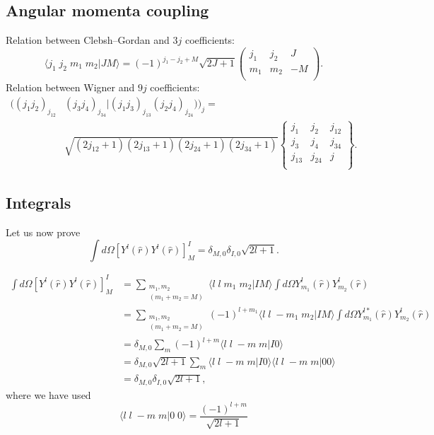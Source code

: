 \begin{subappendices}
\subsection{Angular momenta coupling}
Relation between Clebsh--Gordan and $3j$ coefficients:
\begin{equation}\label{eq204}
\langle j_1\; j_2 \; m_1\;m_2 | J M\rangle=(-1)^{j_1-j_2+M}\sqrt{2J+1}\begin{pmatrix}
  j_1&j_2&J\\
 m_1&m_2&-M\\
\end{pmatrix}.
\end{equation}
Relation between Wigner and $9j$ coefficients:
\begin{equation}\label{eq205}
\begin{split}
\bigl ( (j_1j_2)_{j_{12}}& (j_3j_4)_{j_{34}} |(j_1j_3)_{j_{13}} (j_2j_4)_{j_{24}}) \bigr )_j=\\
&\sqrt{(2j_{12}+1)(2j_{13}+1)(2j_{24}+1)(2j_{34}+1)}\begin{Bmatrix}
  j_1&j_2&j_{12}\\
 j_3&j_4&j_{34}\\
 j_{13}&j_{24}&j\\
\end{Bmatrix}.
\end{split}
\end{equation}
\subsection{Integrals}
Let us now prove
\begin{equation}\label{eq14}
\int d\Omega \left[ Y^{l}(\hat r)Y^{l}(\hat r) \right]^{I}_{M}=\delta_{M,0}\delta_{I,0}\sqrt{2l+1}.
\end{equation}

\begin{equation}\label{eq15}
\begin{split}
\int d\Omega \left[ Y^{l}(\hat r)Y^{l}(\hat r) \right]^{I}_{M}&= \sum_{\substack{m_1,m_2\\(m_1+m_2=M)}}
\langle l\; l \; m_1\;m_2 | I M\rangle \int d\Omega  Y_{m_1}^{l}(\hat r)Y_{m_2}^{l}(\hat r)\\
&=\sum_{\substack{m_1,m_2\\(m_1+m_2=M)}} (-1)^{l+m_1} \langle l\; l \; -m_1\;m_2 | I M\rangle
\int d\Omega  Y_{m_1}^{l*}(\hat r)Y_{m_2}^{l}(\hat r)\\
&= \delta_{M,0}\sum_m (-1)^{l+m} \langle l\; l \; -m\;m | I 0\rangle \\
&= \delta_{M,0}\sqrt{2l+1}\sum_m  \langle l\; l \; -m\;m | I 0\rangle \langle l\; l \; -m\;m | 0 0\rangle \\
&= \delta_{M,0}\delta_{I,0}\sqrt{2l+1},
\end{split}
\end{equation}
where we have used
\begin{equation}\label{eq22}
\langle l \;l \; -m \;m | 0\; 0 \rangle=\frac{(-1)^{l+m}}{\sqrt{2l+1}}
\end{equation}


\end{subappendices}
